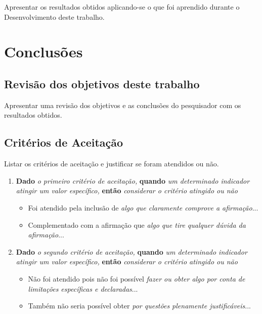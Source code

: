 \begin{displayquote}
    Apresentar os resultados obtidos aplicando-se o que foi aprendido durante o Desenvolvimento deste trabalho.
\end{displayquote}

\section{Conclusões}\label{US9999:conclusoes}

\subsection{Revisão dos objetivos deste trabalho}

\begin{displayquote}
    Apresentar uma revisão dos objetivos e as conclusões do pesquisador com os resultados obtidos.
\end{displayquote}

\subsection{Critérios de Aceitação}

\begin{displayquote}
    Listar os critérios de aceitação e justificar se foram atendidos ou não.
\end{displayquote}

\begin{enumerate}
    \item \textbf{Dado} \textit{o primeiro critério de aceitação,} \textbf{quando} \textit{um determinado indicador atingir um valor específico,} \textbf{então} \textit{considerar o critério atingido ou não}
        \begin{itemize}
            \item Foi atendido pela inclusão de \textit{algo que claramente comprove a afirmação}...
            \item Complementado com a afirmação que \textit{algo que tire qualquer dúvida da afirmação}...
        \end{itemize}
    \item \textbf{Dado} \textit{o segundo critério de aceitação,} \textbf{quando} \textit{um determinado indicador atingir um valor específico,} \textbf{então} \textit{considerar o critério atingido ou não}
        \begin{itemize}
            \item Não foi atendido pois não foi possível \textit{fazer ou obter algo por conta de limitações específicas e declaradas}...
            \item Também não seria possível obter \textit{por questões plenamente justificáveis}...
        \end{itemize}
\end{enumerate}

